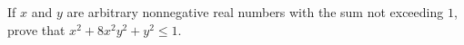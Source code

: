 \problem{}
If $x$ and $y$ are arbitrary nonnegative real numbers with the sum not exceeding $1$,
prove that $x^2 + 8 x^2 y^2 + y^2 \leq 1$.
\solution
\endproblem
